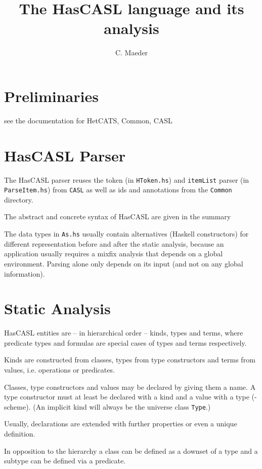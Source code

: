 \documentclass{article}
\begin{document}
\title{The HasCASL language and its analysis}

\author{C. Maeder}

\maketitle

\section{Preliminaries}

see the documentation for HetCATS, Common, CASL

\section{HasCASL Parser}
The HasCASL parser reuses the token (in \texttt{HToken.hs}) and
\texttt{itemList} parser (in \texttt{ParseItem.hs}) from \texttt{CASL} as well
as ids and annotations from the \texttt{Common} directory.

The abstract and concrete syntax of HasCASL are given in the summary

The data types in \texttt{As.hs} usually contain alternatives (Haskell
constructors) for different representation before and after the static
analysis, because an application usually requires a mixfix analysis that
depends on a global environment. Parsing alone only depends on its input
(and not on any global information).

\section{Static Analysis}

HasCASL entities are -- in hierarchical
order -- kinds, types and terms, where predicate types and formulas are
special cases of types and terms respectively.

Kinds are constructed from classes, types from type
constructors and terms from values, i.e. operations or predicates.

Classes, type constructors and values may be declared by giving them a name.
A type constructor must at least be declared with a kind and a value with a
type (-scheme). (An implicit kind will always be the universe class
\texttt{Type}.)

Usually, declarations are extended with further properties or even a unique
definition.

In opposition to the hierarchy a class can be defined as a downset of a type
and a subtype can be defined via a predicate.
\end{document}
